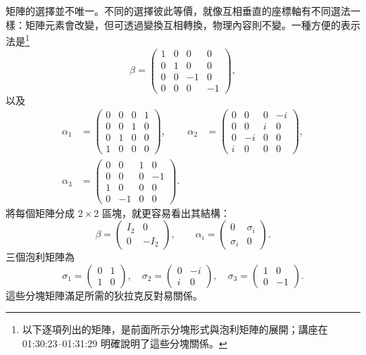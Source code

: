 矩陣的選擇並不唯一。不同的選擇彼此等價，就像互相垂直的座標軸有不同選法一樣：矩陣元素會改變，但可透過變換互相轉換，物理內容則不變。一種方便的表示法是\footnote{以下逐項列出的矩陣，是前面所示分塊形式與泡利矩陣的展開；講座在 01:30:23--01:31:29 明確說明了這些分塊關係。}
\begin{equation}
\beta=
\begin{pmatrix}
1&0&0&0\\
0&1&0&0\\
0&0&-1&0\\
0&0&0&-1
\end{pmatrix},
\end{equation}
以及
\begin{align}
\alpha_1&=
\begin{pmatrix}
0&0&0&1\\
0&0&1&0\\
0&1&0&0\\
1&0&0&0
\end{pmatrix},
&
\alpha_2&=
\begin{pmatrix}
0&0&0&-i\\
0&0&i&0\\
0&-i&0&0\\
i&0&0&0
\end{pmatrix},
\\[1ex]
\alpha_3&=
\begin{pmatrix}
0&0&1&0\\
0&0&0&-1\\
1&0&0&0\\
0&-1&0&0
\end{pmatrix}.
\end{align}
將每個矩陣分成 \(2\times2\) 區塊，就更容易看出其結構：
\begin{equation}
\beta=
\begin{pmatrix}
I_2&0\\
0&-I_2
\end{pmatrix},
\qquad
\alpha_i=
\begin{pmatrix}
0&\sigma_i\\
\sigma_i&0
\end{pmatrix}.
\end{equation}
三個泡利矩陣為
\begin{equation}
\sigma_1=
\begin{pmatrix}
0&1\\
1&0
\end{pmatrix},
\quad
\sigma_2=
\begin{pmatrix}
0&-i\\
i&0
\end{pmatrix},
\quad
\sigma_3=
\begin{pmatrix}
1&0\\
0&-1
\end{pmatrix}.
\end{equation}
這些分塊矩陣滿足所需的狄拉克反對易關係。

